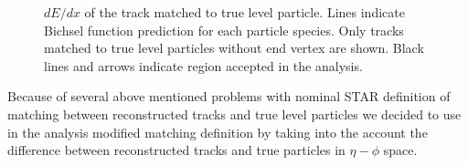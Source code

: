 \begin{figure}[!h]
{	}%
	\caption[$dE/dx$ of the track matched to true level particle.]{$dE/dx$ of the track matched to true level particle. Lines indicate Bichsel function prediction for each particle species. Only tracks matched to  true level particles without end vertex  are shown. Black lines and arrows indicate region accepted in the analysis.}\label{fig:trackSplittingNominaldEdx}
\end{figure}

Because of several above mentioned  problems with  nominal STAR definition of matching between reconstructed tracks and true  level particles we decided to use in the analysis modified matching            
definition by taking into the account the difference    between reconstructed tracks and true particles in $\eta-\phi$ space.





